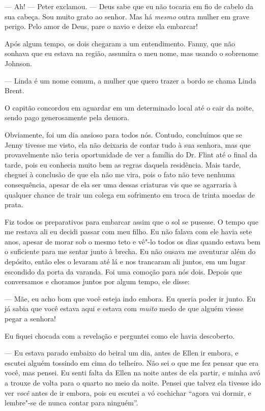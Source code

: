 --- Ah! --- Peter exclamou. --- Deus
sabe que eu não tocaria em fio de cabelo da sua cabeça. Sou muito grato
ao senhor. Mas há \emph{mesmo} outra mulher em grave perigo. Pelo amor
de Deus, pare o navio e deixe ela embarcar!

Após algum tempo, os dois chegaram a um
entendimento. Fanny, que não sonhava que eu estava na região, assumira o
meu nome, mas usando o sobrenome Johnson.

--- Linda é um nome comum, a mulher que quero trazer a bordo se chama
Linda Brent.

O capitão concordou em aguardar em um
determinado local até o cair da noite, sendo pago generosamente pela
demora.

Obviamente, foi um dia ansioso para
todos nós. Contudo, concluímos que se Jenny tivesse me visto, ela não
deixaria de contar tudo à sua senhora, mas que provavelmente não teria
oportunidade de ver a família do Dr. Flint até o final da tarde, pois eu
conhecia muito bem as regras daquela residência. Mais tarde, cheguei à
conclusão de que ela não me vira, pois o fato não teve nenhuma
consequência, apesar de ela ser uma dessas criaturas vis que se
agarraria à qualquer chance de trair um colega em sofrimento em troca de
trinta moedas de prata.

Fiz todos os preparativos para embarcar
assim que o sol se pusesse. O tempo que me restava ali eu decidi passar
com meu filho. Eu não falava com ele havia sete anos, apesar de morar
sob o mesmo teto e vê"-lo todos os dias quando estava bem o suficiente
para me sentar junto à brecha. Eu não ousava me aventurar além do
depósito, então eles o levaram até lá e nos trancaram ali juntos, em um
lugar escondido da porta da varanda. Foi uma comoção para nós dois.
Depois que conversamos e choramos juntos por algum tempo, ele disse:

--- Mãe, eu acho bom que você esteja indo embora. Eu queria poder ir
junto. Eu já sabia que você estava aqui e estava com \emph{muito} medo
de que alguém viesse pegar a senhora!

Eu fiquei chocada com a revelação e perguntei como ele havia descoberto.

--- Eu estava parado embaixo do beiral
um dia, antes de Ellen ir embora, e escutei alguém tossindo em cima do
telheiro. Não sei o que me fez pensar que era você, mas pensei. Eu senti
falta da Ellen na noite antes de ela partir, e minha avó a trouxe de
volta para o quarto no meio da noite. Pensei que talvez ela tivesse ido
ver \emph{você} antes de ir embora, pois eu escutei a vó cochichar
``agora vai dormir, e lembre"-se de nunca contar para ninguém''.

